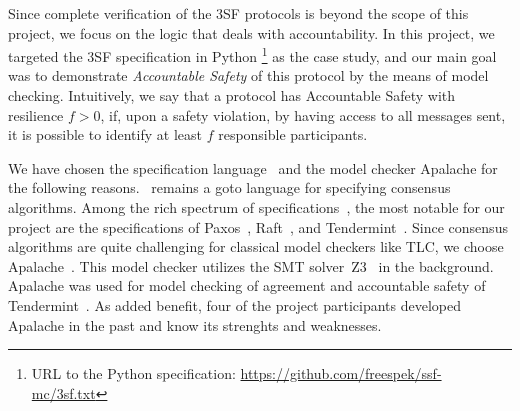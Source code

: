 Since complete verification of the 3SF protocols is beyond the scope of this
project, we focus on the logic that deals with accountability.
In this project, we targeted the 3SF specification in Python \footnote{URL to the Python specification:
\url{https://github.com/freespek/ssf-mc/3sf.txt}} as the case study, and our main goal was to demonstrate 
\emph{Accountable Safety} of this protocol by the means of model checking. 
Intuitively, we say that a protocol has Accountable Safety with resilience $f > 0$, if, upon a safety violation, by having access to 
all messages sent, it is possible to identify at least $f$ responsible participants. 



We have chosen the specification language~\tlap{} and the model checker
Apalache for the following reasons.\ \tlap{} remains a goto language for
specifying consensus algorithms. Among the rich spectrum of
specifications~\cite{tla-examples}, the most notable for our project are the
specifications of Paxos~\cite{lamport2001paxos}, Raft~\cite{Ongaro14}, and
Tendermint~\cite{abs-1807-04938,TendermintSpec2020}. Since consensus algorithms
are quite challenging for classical model checkers like TLC, we choose
Apalache~\cite{Apalache2024,KT19,KonnovKM22}. This model checker utilizes the
SMT solver~Z3~\cite{MouraB08} in the background. Apalache was used for model
checking of agreement and accountable safety of
Tendermint~\cite{TendermintSpec2020}. As added benefit, four of the project
participants developed Apalache in the past and know its strenghts and
weaknesses.

